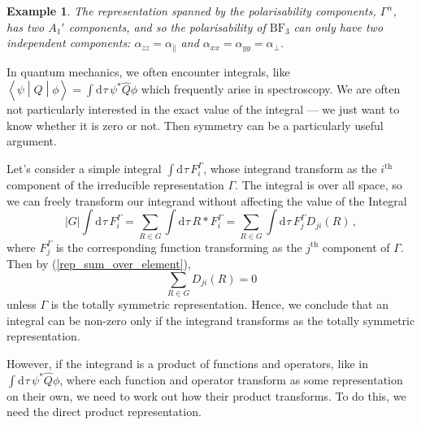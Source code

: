 \documentclass{article}
\theoremstyle{plain}\theoremheaderfont{\normalfont\itshape}\theorembodyfont{\rmfamily}\theoremseparator{.}\newtheorem*{rem}{Remark}\newtheorem*{ex}{Example}\newtheorem*{proof}{Proof}\newtheorem*{altp}{Alternative proof}
\theoremstyle{plain}\theoremheaderfont{\normalfont\bfseries}\theorembodyfont{\rmfamily}\theoremseparator{.}\newtheorem{thm}{Theorem}[section]\newtheorem{lem}[thm]{Lemma}\newtheorem{prop}[thm]{Proposition}\newtheorem*{cor}{Corollary}\newtheorem{defn}[thm]{Definition}\newtheorem{clm}[thm]{Claim}\newtheorem{clminproof}{Claim}\newtheorem*{law}{Law}\newtheorem{pos}[thm]{Postulate}
\theoremstyle{break}\theoremheaderfont{\normalfont\itshape}\theorembodyfont{\rmfamily}\theoremseparator{.\medskip}\newtheorem*{proofskip}{Proof}\newtheorem*{exs}{Examples}\newtheorem*{rems}{Remarks}
\theoremstyle{break}\theoremheaderfont{\normalfont\bfseries}\theorembodyfont{\rmfamily}\theoremseparator{.\medskip}\newtheorem{lemskip}[thm]{Lemma}\newtheorem{defnskip}[thm]{Definition}\newtheorem{propskip}[thm]{Proposition}\newtheorem{thmskip}[thm]{Theorem}
\numberwithin{equation}{section}
\newcommand{\dd}[2][]{\mathrm{d}^{#1} #2\,}
\newcommand{\mel}[3]{\left\langle #1 \middle| #2 \middle| #3 \right\rangle}
\newcommand{\abs}[1]{\left| #1 \right|}
\begin{document}
\begin{ex}
        The representation spanned by the polarisability components, \(\Gamma^{\alpha}\), has two \(A_1'\) components, and so the polarisability of \(\mathrm{BF_3}\) can only have two independent components: \(\alpha_{zz}=\alpha_{\parallel}\) and \(\alpha_{xx}=\alpha_{yy}=\alpha_{\perp}\).
    \end{ex}

    In quantum mechanics, we often encounter integrals, like \(\mel{\psi}{\hat{Q}}{\phi}=\int\dd{\tau}\psi^*\hat{Q}\phi\) which frequently arise in spectroscopy. We are often not particularly interested in the exact value of the integral --- we just want to know whether it is zero or not. Then symmetry can be a particularly useful argument.

    Let's consider a simple integral \(\int\dd{\tau}F_i^\Gamma\), whose integrand transform as the \(i^{\text{th}}\) component of the irreducible representation \(\Gamma\). The integral is over all space, so we can freely transform our integrand without affecting the value of the Integral
    \begin{equation}
        \abs{G}\int\dd{\tau} F_i^\Gamma=\sum_{R\in G}\int\dd{\tau}R*F_i^\Gamma=\sum_{R\in G}\int\dd{\tau}F_j^{\Gamma}D_{ji}(R)\,,
    \end{equation}
    where \(F_j^{\Gamma}\) is the corresponding function transforming as the \(j^{\text{th}}\) component of \(\Gamma\). Then by (\ref{rep_sum_over_element}),
    \begin{equation}
        \sum_{R\in G}D_{ji}(R)=0
    \end{equation}
    unless \(\Gamma\) is the totally symmetric representation. Hence, we conclude that an integral can be non-zero only if the integrand transforms as the totally symmetric representation.

    However, if the integrand is a product of functions and operators, like in \(\int\dd{\tau}\psi^*\hat{Q}\phi\), where each function and operator transform as some representation on their own, we need to work out how their product transforms. To do this, we need the direct product representation.
\end{document}

